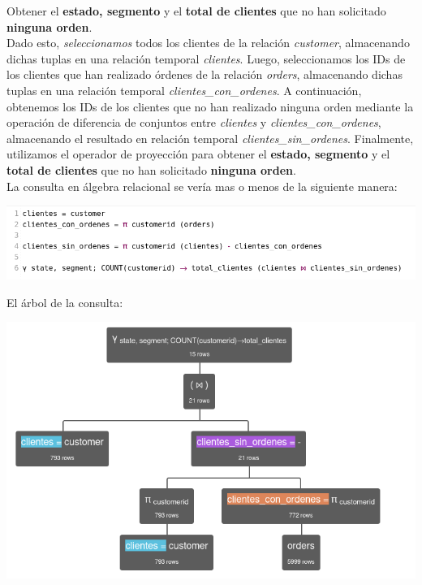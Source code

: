 Obtener el \textbf{estado, segmento} y el \textbf{total de clientes} que no han solicitado \textbf{ninguna orden}. \\

Dado esto, \textit{seleccionamos} todos los clientes de la relación \textit{customer}, almacenando dichas tuplas en una relación temporal \textit{clientes}. Luego, seleccionamos los IDs de los clientes que han realizado órdenes de la relación \textit{orders}, almacenando dichas tuplas en una relación temporal \textit{clientes\_con\_ordenes}. A continuación, obtenemos los IDs de los clientes que no han realizado ninguna orden mediante la operación de diferencia de conjuntos entre \textit{clientes} y \textit{clientes\_con\_ordenes}, almacenando el resultado en relación temporal \textit{clientes\_sin\_ordenes}. Finalmente, utilizamos el operador de proyección para obtener el \textbf{estado, segmento} y el \textbf{total de clientes} que no han solicitado \textbf{ninguna orden}. \\

La consulta en álgebra relacional se vería mas o menos de la siguiente manera: \\

\begin{center}
    \includegraphics[width=14cm]{resources/pregunta2/2.5.1.png} \\
\end{center}

El árbol de la consulta: \\

\begin{center}
    \includegraphics[width=14cm]{resources/pregunta2/2.5.2.png} \\
\end{center}

